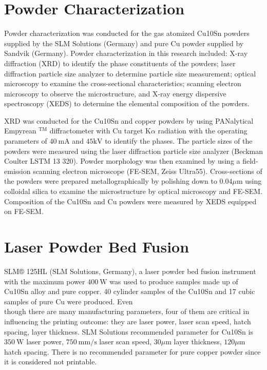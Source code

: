 \documentclass[10pt]{article}
\begin{document}
\section*{Powder Characterization}
Powder characterization was conducted for the gas atomized Cu10Sn powders supplied by the SLM Solutions (Germany) and pure Cu powder supplied by Sandvik (Germany). Powder characterization in this research included: X-ray diffraction (XRD) to identify the phase constituents of the powders; laser diffraction particle size analyzer to determine particle size measurement; optical microscopy to examine the cross-sectional characteristics; scanning electron microscopy to observe the microstructure, and X-ray energy dispersive spectroscopy (XEDS) to determine the elemental composition of the powders.

XRD was conducted for the Cu10Sn and copper powders by using PANalytical Empyrean $^{\mathrm{TM}}$ diffractometer with $\mathrm{Cu}$ target $\mathrm{K} \alpha$ radiation with the operating parameters of $40 \mathrm{~mA}$ and $45 \mathrm{kV}$ to identify the phases. The particle sizes of the powders were measured using the laser diffraction particle size analyzer (Beckman Coulter LSTM 13 320). Powder morphology was then examined by using a field-emission scanning electron microscope (FE-SEM, Zeiss Ultra55). Cross-sections of the powders were prepared metallographically by polishing down to $0.04 \mu \mathrm{m}$ using colloidal silica to examine the microstructure by optical microscopy and FE-SEM. Composition of the Cu10Sn and $\mathrm{Cu}$ powders were measured by XEDS equipped on FE-SEM.

\section*{Laser Powder Bed Fusion}
SLM® 125HL (SLM Solutions, Germany), a laser powder bed fusion instrument with the maximum power $400 \mathrm{~W}$ was used to produce samples made up of Cu10Sn alloy and pure copper. 40 cylinder samples of the Cu10Sn and 17 cubic samples of pure $\mathrm{Cu}$ were produced. Even\\
though there are many manufacturing parameters, four of them are critical in influencing the printing outcome: they are laser power, laser scan speed, hatch spacing, layer thickness. SLM Solutions recommended parameter for Cu10Sn is $350 \mathrm{~W}$ laser power, $750 \mathrm{~mm} / \mathrm{s}$ laser scan speed, $30 \mu \mathrm{m}$ layer thickness, $120 \mu \mathrm{m}$ hatch spacing. There is no recommended parameter for pure copper powder since it is considered not printable.
\end{document}

